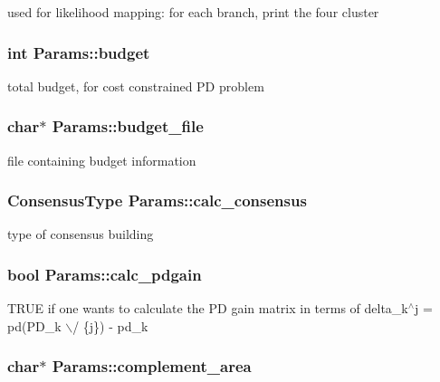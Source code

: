 used for likelihood mapping: for each branch, print the four cluster \hypertarget{structParams_a9d6288f6b41f2be731b7250dbc7cf6df}{
\subsubsection[{budget}]{\setlength{\rightskip}{0pt plus 5cm}int {\bf Params::budget}}}
\label{structParams_a9d6288f6b41f2be731b7250dbc7cf6df}
total budget, for cost constrained PD problem \hypertarget{structParams_a256c00c33ab2ce34c017b8e2110c53cc}{
\subsubsection[{budget\_\-file}]{\setlength{\rightskip}{0pt plus 5cm}char$\ast$ {\bf Params::budget\_\-file}}}
\label{structParams_a256c00c33ab2ce34c017b8e2110c53cc}
file containing budget information \hypertarget{structParams_a5ec9506c1542fcae316153229fb4c9be}{
\subsubsection[{calc\_\-consensus}]{\setlength{\rightskip}{0pt plus 5cm}ConsensusType {\bf Params::calc\_\-consensus}}}
\label{structParams_a5ec9506c1542fcae316153229fb4c9be}
type of consensus building \hypertarget{structParams_a2131820dbdf84b690e9ba5459bc4cec8}{
\subsubsection[{calc\_\-pdgain}]{\setlength{\rightskip}{0pt plus 5cm}bool {\bf Params::calc\_\-pdgain}}}
\label{structParams_a2131820dbdf84b690e9ba5459bc4cec8}
TRUE if one wants to calculate the PD gain matrix in terms of delta\_\-k$^\wedge$j = pd(PD\_\-k $\backslash$/ \{j\}) -\/ pd\_\-k \hypertarget{structParams_a1386d8afdf2ff06b85f3a0be5ddfa823}{
\subsubsection[{complement\_\-area}]{\setlength{\rightskip}{0pt plus 5cm}char$\ast$ {\bf Params::complement\_\-area}}}
